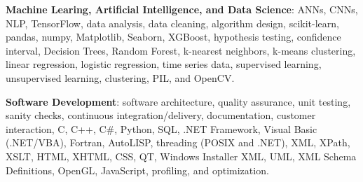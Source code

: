 \documentclass{leresume}
\begin{document}
	
	
    
    
    
    

    \begin{bulletedlist}
		
		\item \textbf{Machine Learing, Artificial Intelligence, and Data Science}: ANNs,
                        CNNs,
                        NLP,
                        TensorFlow,
                        data analysis,
                        data cleaning,
                        algorithm design,
                        scikit-learn,
                        pandas,
                        numpy,
                        Matplotlib,
                        Seaborn,
                        XGBoost,
                        hypothesis testing,
                        confidence interval,
                        Decision Trees,
                        Random Forest,
                        k-nearest neighbors,
                        k-means clustering,
                        linear regression,
                        logistic regression,
                        time series data,
                        supervised learning,
                        unsupervised learning,
                        clustering,
                        PIL,
                        and OpenCV.
                        
		\item \textbf{Software Development}: software architecture,
                        quality assurance,
                        unit testing,
                        sanity checks,
                        continuous integration/delivery,
                        documentation,
                        customer interaction,
                        C,
                        C++,
                        C\#,
                        Python,
                        SQL,
                        .NET Framework,
                        Visual Basic (.NET/VBA),
                        Fortran,
                        AutoLISP,
                        threading (POSIX and .NET),
                        XML,
                        XPath,
                        XSLT,
                        HTML,
                        XHTML,
                        CSS,
                        QT,
                        Windows Installer XML,
                        UML,
                        XML Schema Definitions,
                        OpenGL,
                        JavaScript,
                        profiling,
                        and optimization.
                        

\end{bulletedlist}
\end{document}
